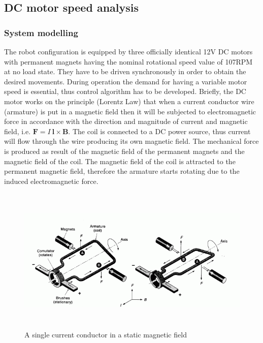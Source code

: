 \documentclass[12pt,english,twoside]{article}
\begin{document}
\subsection{DC motor speed analysis}
\subsubsection{System modelling}
The robot configuration is equipped by three officially identical 12V DC motors with permanent magnets having the nominal rotational speed value of 107RPM at no load state. They have to be driven synchronously in order to obtain the desired movements. During operation the demand for having a variable motor speed is essential, thus control algorithm has to be developed. 
Briefly, the DC motor works on the principle (Lorentz Law) that when a current conductor wire (armature) is put in a magnetic field then it will be subjected to electromagnetic force in accordance with the direction and magnitude of current and magnetic field, i.e. $\mathbf{F} = I~\mathbf{l} \times \mathbf{B}$. The coil is connected to a DC power source, thus current will flow through the wire producing its own magnetic field. The mechanical force is produced as result of the magnetic field of the permanent magnets and the magnetic field of the coil. The magnetic field of the coil is attracted to the permanent magnetic field, therefore the armature starts rotating due to the induced electromagnetic force.
\begin{figure}[htb!]
	\centering
	\includegraphics[height=7cm]{figures/dc_conducting_wire.png}
	\caption{A single current conductor in a static magnetic field \cite{dc_motor_2}}
	\label{dc_conducting_wire}
\end{figure}
\end{document}
